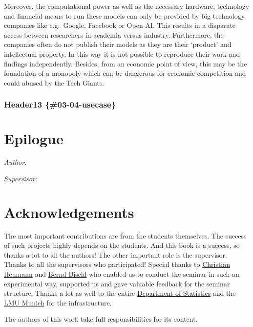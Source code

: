 \documentclass[
]{krantz}
\begin{document}
Moreover, the computational power as well as the necessary hardware, technology and financial means to run these models can only be provided by big technology companies like e.g.~Google, Facebook or Open AI. This results in a disparate access between researchers in academia versus industry. Furthermore, the companies often do not publish their models as they are their `product' and intellectual property. In this way it is not possible to reproduce their work and findings independently. Besides, from an economic point of view, this may be the foundation of a monopoly which can be dangerous for economic competition and could abused by the Tech Giants.

\hypertarget{header13-03-04-usecase}{%
\subsection{Header13 \{\#03-04-usecase\}}\label{header13-03-04-usecase}}

\hypertarget{epilogue}{%
\chapter{Epilogue}\label{epilogue}}

\emph{Author:}

\emph{Supervisor:}

\hypertarget{acknowledgements}{%
\chapter{Acknowledgements}\label{acknowledgements}}

The most important contributions are from the students themselves.
The success of such projects highly depends on the students.
And this book is a success, so thanks a lot to all the authors!
The other important role is the supervisor.
Thanks to all the supervisors who participated!
Special thanks to \href{https://www.misoda.statistik.uni-muenchen.de/personen/professoren/heumann/index.html}{Christian Heumann} and \href{https://www.statistik.uni-muenchen.de/personen/professoren/bischl/index.html}{Bernd Bischl} who enabled us to conduct the seminar in such an experimental way, supported us and gave valuable feedback for the seminar structure.
Thanks a lot as well to the entire \href{https://www.statistik.uni-muenchen.de/}{Department of Statistics} and the \href{http://www.en.uni-muenchen.de/index.html}{LMU Munich} for the infrastructure.

The authors of this work take full responsibilities for its content.

  

\backmatter
\printindex
\end{document}
